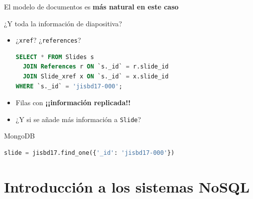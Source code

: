 \documentclass[14pt]{beamer}
\begin{document}
\begin{frame}
\begin{itemize}
\end{itemize}

\begin{block}{El modelo de documentos es {\bf más natural en este caso}}
\end{block}

\framebreak

\begin{alertblock}{¿Y toda la información de diapositiva?}
\begin{itemize}
\begin{lstlisting}[language=sql]
SELECT * FROM Slides WHERE `_id` = 'jisbd17-000';
\end{lstlisting}
  \item ¿{\tt xref}? ¿{\tt references}?
\begin{lstlisting}[language=sql]
SELECT * FROM Slides s
  JOIN References r ON `s._id` = r.slide_id
  JOIN Slide_xref x ON `s._id` = x.slide_id
WHERE `s._id` = 'jisbd17-000';
\end{lstlisting}
\item Filas con {\bf ¡¡información replicada!!}
\item ¿Y si se añade más información a {\tt Slide}?
  \end{itemize}
\end{alertblock}

\framebreak

\begin{block}{MongoDB}
\begin{lstlisting}[language=Python]
slide = jisbd17.find_one({'_id': 'jisbd17-000'})
\end{lstlisting}
\end{block}

\end{frame}


\section{Introducción a los sistemas NoSQL}
\end{document}
